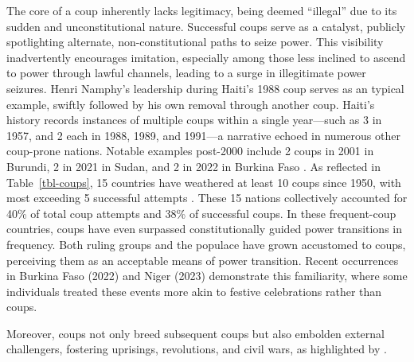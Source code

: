 \documentclass[
  12pt,
  a4paper,
  12pt]{article}
\begin{document}
The core of a coup inherently lacks legitimacy, being deemed ``illegal''
due to its sudden and unconstitutional nature. Successful coups serve as
a catalyst, publicly spotlighting alternate, non-constitutional paths to
seize power. This visibility inadvertently encourages imitation,
especially among those less inclined to ascend to power through lawful
channels, leading to a surge in illegitimate power seizures. Henri
Namphy's leadership during Haiti's 1988 coup serves as an typical
example, swiftly followed by his own removal through another coup.
Haiti's history records instances of multiple coups within a single
year---such as 3 in 1957, and 2 each in 1988, 1989, and 1991---a
narrative echoed in numerous other coup-prone nations. Notable examples
post-2000 include 2 coups in 2001 in Burundi, 2 in 2021 in Sudan, and 2
in 2022 in Burkina Faso \citep{powell2011}. As reflected in
Table~\ref{tbl-coups}, 15 countries have weathered at least 10 coups
since 1950, with most exceeding 5 successful attempts
\citep{powell2011}. These 15 nations collectively accounted for 40\% of
total coup attempts and 38\% of successful coups. In these frequent-coup
countries, coups have even surpassed constitutionally guided power
transitions in frequency. Both ruling groups and the populace have grown
accustomed to coups, perceiving them as an acceptable means of power
transition. Recent occurrences in Burkina Faso (2022) and Niger (2023)
demonstrate this familiarity, where some individuals treated these
events more akin to festive celebrations rather than coups.

Moreover, coups not only breed subsequent coups but also embolden
external challengers, fostering uprisings, revolutions, and civil wars,
as highlighted by \citet{dahl2023}.
\end{document}
